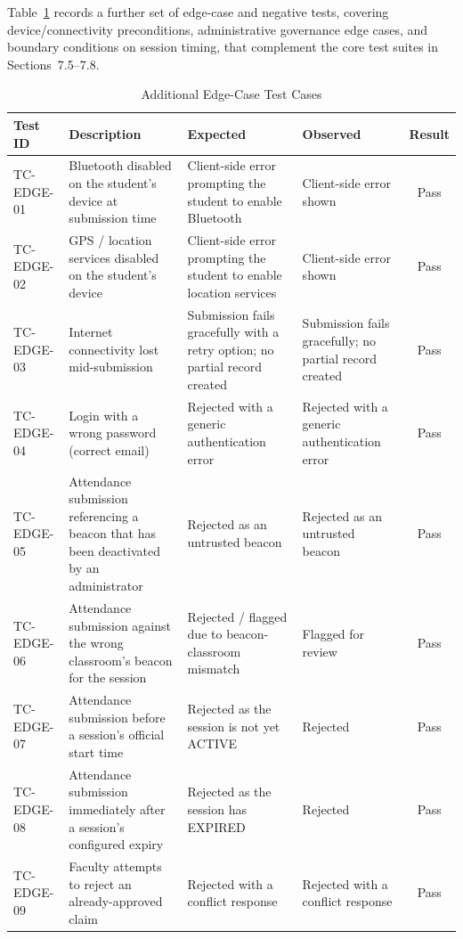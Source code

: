 \documentclass[12pt, a4paper, oneside]{report}
\begin{document}
Table~\ref{tab:edge-tests} records a further set of edge-case and negative tests, covering device/connectivity preconditions, administrative governance edge cases, and boundary conditions on session timing, that complement the core test suites in Sections~7.5--7.8.

\begin{table}[htbp]
\centering
\caption{Additional Edge-Case Test Cases}
\label{tab:edge-tests}
\tiny
\begin{tabularx}{\textwidth}{|l|X|X|X|c|}
\hline
\textbf{Test ID} & \textbf{Description} & \textbf{Expected} & \textbf{Observed} & \textbf{Result} \\
\hline
TC-EDGE-01 & Bluetooth disabled on the student's device at submission time & Client-side error prompting the student to enable Bluetooth & Client-side error shown & Pass \\
\hline
TC-EDGE-02 & GPS / location services disabled on the student's device & Client-side error prompting the student to enable location services & Client-side error shown & Pass \\
\hline
TC-EDGE-03 & Internet connectivity lost mid-submission & Submission fails gracefully with a retry option; no partial record created & Submission fails gracefully; no partial record created & Pass \\
\hline
TC-EDGE-04 & Login with a wrong password (correct email) & Rejected with a generic authentication error & Rejected with a generic authentication error & Pass \\
\hline
TC-EDGE-05 & Attendance submission referencing a beacon that has been deactivated by an administrator & Rejected as an untrusted beacon & Rejected as an untrusted beacon & Pass \\
\hline
TC-EDGE-06 & Attendance submission against the wrong classroom's beacon for the session & Rejected / flagged due to beacon-classroom mismatch & Flagged for review & Pass \\
\hline
TC-EDGE-07 & Attendance submission before a session's official start time & Rejected as the session is not yet ACTIVE & Rejected & Pass \\
\hline
TC-EDGE-08 & Attendance submission immediately after a session's configured expiry & Rejected as the session has EXPIRED & Rejected & Pass \\
\hline
TC-EDGE-09 & Faculty attempts to reject an already-approved claim & Rejected with a conflict response & Rejected with a conflict response & Pass \\
\hline

\end{tabularx}
\end{table}
\end{document}
